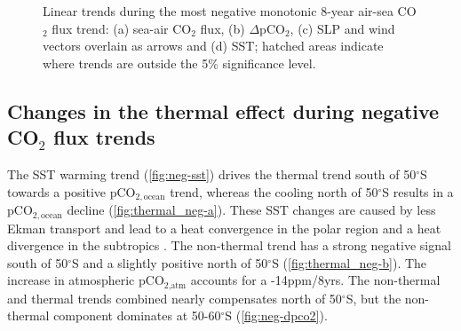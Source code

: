 \begin{figure}[bth]
        \myfloatalign
         \\
         
         \\
        \caption{Linear trends during the most negative monotonic 8-year air-sea CO$_2$ flux trend: (a) sea-air CO$_2$ flux, (b) $\Delta$pCO$_2$, (c) \ac{SLP} and wind vectors overlain as arrows and (d) \acf{SST}; hatched areas indicate where trends are outside the 5\% significance level.} \label{fig:neg}
\end{figure}



\clearpage

\subsection{Changes in the thermal effect during negative CO$_2$ flux trends}
\label{sec:trends_neg_thermal}

The \ac{SST} warming trend (\autoref{fig:neg-sst}) drives the thermal trend south of 50$^\circ$S towards a positive pCO$_{2,\text{ocean}}$ trend, whereas the cooling north of 50$^\circ$S results in a pCO$_{2,\text{ocean}}$ decline (\autoref{fig:thermal_neg-a}). These \acs{SST} changes are caused by less Ekman transport and lead to a heat convergence in the polar region and a heat divergence in the subtropics \citep{Hall2002}. The non-thermal trend has a strong negative signal south of 50$^\circ$S and a slightly positive north of 50$^\circ$S (\autoref{fig:thermal_neg-b}). The increase in atmospheric pCO$_{\text{2,atm}}$ accounts for a -14ppm/8yrs. The non-thermal and thermal trends combined nearly compensates north of 50$^\circ$S, but the non-thermal component dominates at 50-60$^\circ$S (\autoref{fig:neg-dpco2}). 

